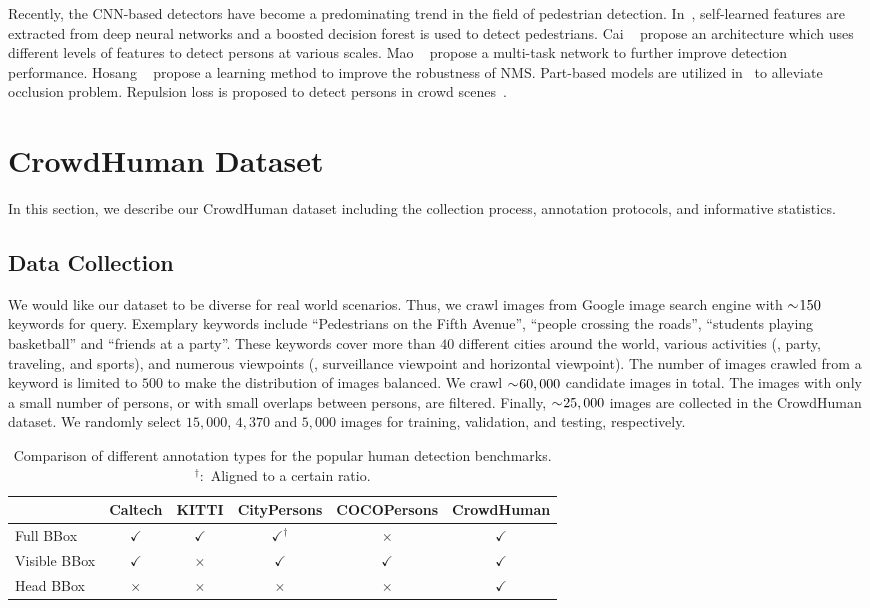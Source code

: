 \documentclass[10pt,twocolumn,letterpaper]{article}
\begin{document}
Recently, the CNN-based detectors have become a predominating trend in the field of pedestrian detection. In~\cite{zhang2016faster}, self-learned features are extracted from deep neural networks and a boosted decision forest is used to detect pedestrians. Cai \etal~\cite{cai2016unified} propose an architecture which uses different levels of features to detect persons at various scales. Mao \etal~\cite{mao2017can} propose a multi-task network to further improve detection performance. Hosang \etal~\cite{Hosang_2017_CVPR} propose a learning method to improve the robustness of NMS. Part-based models are utilized in~\cite{ouyang2012discriminative,zhou2017multi} to alleviate occlusion problem. Repulsion loss is proposed to detect persons in crowd scenes~\cite{wang2018Repulsion}.


\section{CrowdHuman Dataset}
\label{sec:dataset}
In this section, we describe our CrowdHuman dataset including the collection process, annotation protocols, and informative statistics.
\subsection{Data Collection}
We would like our dataset to be diverse for real world scenarios. Thus, we crawl images from Google image search engine with $\sim\negmedspace 150$ keywords for query. Exemplary keywords include ``Pedestrians on the Fifth Avenue'', ``people crossing the roads'', ``students playing basketball'' and ``friends at a party''. These keywords cover more than $40$ different cities around the world, various activities (\eg, party, traveling, and sports), and numerous viewpoints (\eg, surveillance viewpoint and horizontal viewpoint). The number of images crawled from a keyword is limited to $500$ to make the distribution of images balanced. We crawl $\sim\negmedspace 60,000$ candidate images in total. The images with only a small number of persons, or with small overlaps between persons, are filtered. Finally, $\sim\negmedspace 25,000$ images are collected in the CrowdHuman dataset. We randomly select $15,000$, $4,370$ and $5,000$ images for training, validation, and testing, respectively. 



\begin{table*}[!t]
\centering
\begin{tabular}{l|ccccc}
\hline
\hline
 & Caltech & KITTI & CityPersons & COCOPersons & CrowdHuman \\
\hline
Full BBox & $\checkmark$ & $\checkmark$ & $\checkmark^{\dagger}$ & $\times$ & $\checkmark$\\
Visible BBox & $\checkmark$ & $\times$  & $\checkmark$ & $\checkmark$ & $\checkmark$ \\
Head BBox & $\times$ & $\times$ & $\times$ & $\times$ & $\checkmark$ \\
\hline
\end{tabular}
\caption{\label{tab:annotation_comparison} Comparison of different annotation types for the popular human detection benchmarks.${}^{\dagger}:$ Aligned to a certain ratio.}
\end{table*}
\end{document}
